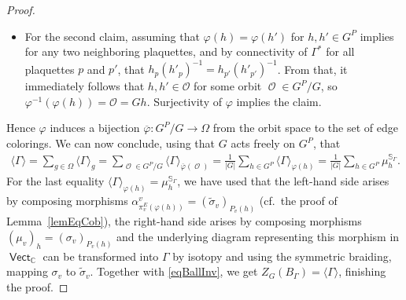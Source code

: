 \documentclass[10pt,a4paper]{amsart}
\DeclareMathOperator{\vect}{\mathsf{Vect}}
\DeclareMathOperator{\C}{\mathbb{C}}
\DeclareMathOperator{\calo}{\mathcal{O}}
\numberwithin{equation}{section}
\theoremstyle{definition}
\begin{document}
\begin{proof}
\begin{itemize}
 \item For the second claim, assuming that $\varphi(h) = \varphi(h')$ for $h, h' \in G^P$ implies for any two neighboring plaquettes, and by connectivity of $\Gamma^*$ for all plaquettes $p$ and $p'$, that $ h_{p}(h'_{p})^{-1} = h_{p'}(h'_{p'})^{-1}$. From that, it immediately follows that $h, h' \in \mathcal{O}$ for some orbit $\calo \in G^P/G$, so $\varphi^{-1}(\varphi(h)) = \mathcal{O} = Gh$. Surjectivity of $\varphi$ implies the claim.
\end{itemize}
Hence $\varphi$ induces a bijection $\overline{\varphi}\colon G^P/G \rightarrow \Omega$ from the orbit space to the set of edge colorings. We can now conclude, using that $G$ acts freely on $G^P$, that
\begin{align*}
 \langle \Gamma \rangle = \sum_{g \in \Omega}\langle \Gamma \rangle_g = \sum_{\calo \in G^P/G} \langle \Gamma \rangle_{\overline{\varphi}(\calo)} = \frac{1}{|G|}\sum_{h \in G^P}\langle \Gamma \rangle_{\varphi(h)} = \frac{1}{|G|}\sum_{h \in G^P}\mu_h^{\mathbb{S}_{\Gamma}}.
\end{align*}
For the last equality $\langle \Gamma \rangle_{\varphi(h)} = \mu_h^{\mathbb{S}_{\Gamma}}$, we have used that the left-hand side arises by composing morphisms $\alpha_{\pi_v^E(\varphi(h))}^v = (\widetilde{\sigma}_v)_{P_v(h)}$ (cf.\ the proof of Lemma~\ref{lemEqCob}),
the right-hand side arises by composing morphisms $(\mu_v)_h = (\sigma_v)_{P_v(h)}$ and the underlying diagram representing this morphism in $\vect_{\C}$ can be transformed into $\Gamma$ by isotopy and using the symmetric braiding, mapping $\sigma_v$ to $\widetilde{\sigma}_v$. Together with \eqref{eqBallInv}, we get $Z_G(B_{\Gamma}) = \langle \Gamma \rangle$, finishing the proof.
\end{proof}
\end{document}
